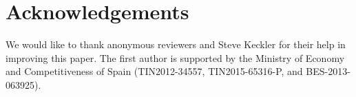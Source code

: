 \documentclass[sigconf]{acmart}
\begin{document}


\maketitle










\section*{Acknowledgements}

\indent We would like to thank anonymous reviewers and Steve Keckler for their help in improving this paper. The first author is supported by the Ministry of Economy and Competitiveness of Spain (TIN2012-34557, TIN2015-65316-P, and BES-2013-063925).



\end{document}
